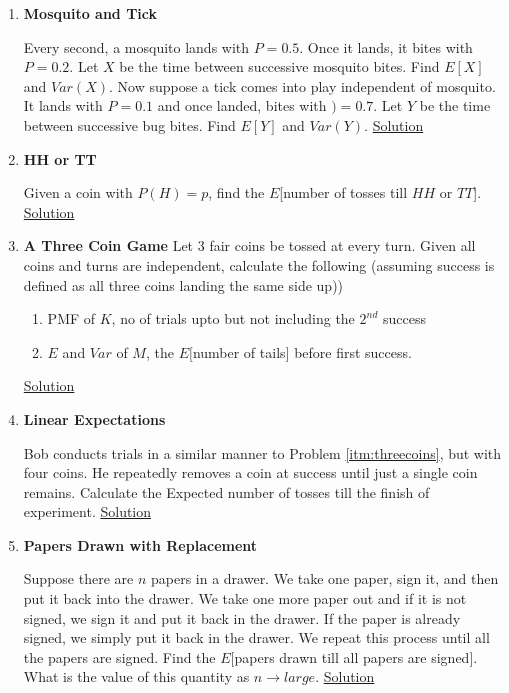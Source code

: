 \documentclass[11pt, a4paper]{article}
\begin{document}
\begin{enumerate}
    \item \hypertarget{q_mosquito}{\textbf{Mosquito and Tick}}\newline
    Every second, a mosquito lands with $P = 0.5$. Once it lands, it bites with $P=0.2$. Let $X$ be the time between successive mosquito bites. Find $E[X]$ and $Var(X)$.\newline
    Now suppose a tick comes into play independent of mosquito. It lands with $P=0.1$ and once landed, bites with $)=0.7$. Let $Y$ be the time between successive bug bites. Find $E[Y]$ and $Var(Y)$. \hyperlink{a_mosquito}{Solution}

    \item \hypertarget{q_hhtt}{\textbf{HH or TT}}\newline
    Given a coin with $P(H) = p$, find the $E$[number of tosses till $HH$ or $TT$]. \hyperlink{a_hhtt}{Solution}

    \item \label{itm:threecoins} \hypertarget{q_threecoins}{\textbf{A Three Coin Game}}\newline
    Let $3$ fair coins be tossed at every turn. Given all coins and turns are independent, calculate the following (assuming success is defined as all three coins landing the same side up))
    \begin{enumerate}
        \item PMF of $K$, no of trials upto but not including the $2^{nd}$ success
        \item $E$ and $Var$ of $M$, the $E[$number of tails$]$ before first success.
    \end{enumerate}
    \hyperlink{a_threecoins}{Solution}


    \item \hypertarget{q_linexp}{\textbf{Linear Expectations}}\newline
    Bob conducts trials in a similar manner to Problem \ref{itm:threecoins}, but with four coins. He repeatedly removes a coin at success until just a single coin remains. Calculate the Expected number of tosses till the finish of experiment. \hyperlink{a_linexp}{Solution}
    

    \item \hypertarget{q_papers}{\textbf{Papers Drawn with Replacement}}\newline
    Suppose there are $n$ papers in a drawer. We take one paper, sign it, and then put it back into the drawer. We take one more paper out and if it is not signed, we sign it and put it back in the drawer. If the paper is already signed, we simply put it back in the drawer. We repeat this process until all the papers are signed. Find the $E[$papers drawn till all papers are signed$]$. What is the value of this quantity as $n \to large$. \hyperlink{a_papers}{Solution}


\end{enumerate}
\end{document}
